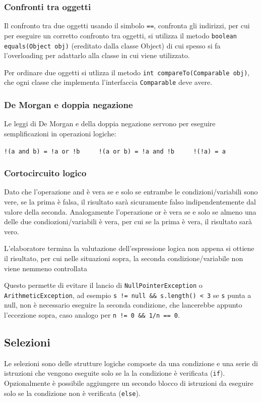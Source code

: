 \documentclass{article}
\begin{document}
\subsubsection*{Confronti tra oggetti}
Il confronto tra due oggetti usando il simbolo \verb|==|, confronta gli indirizzi, per cui per eseguire un corretto confronto tra
oggetti, si utilizza il metodo \verb|boolean equals(Object obj)| (ereditato dalla classe Object) di cui spesso si fa l'overloading
per adattarlo alla classe in cui viene utilizzato.

Per ordinare due oggetti si utlizza il metodo \verb|int compareTo(Comparable obj)|, che ogni classe che implementa l'interfaccia
\verb|Comparable| deve avere.

\subsubsection*{De Morgan e doppia negazione}
Le leggi di De Morgan e della doppia negazione servono per eseguire semplificazioni in operazioni logiche:
\begin{center}
	\verb|!(a and b) = !a or !b| \(\qquad\) \verb|!(a or b) = !a and !b| \(\qquad\) \verb|!(!a) = a|
\end{center}

\subsubsection*{Cortocircuito logico}
Dato che l'operazione and è vera se e solo se entrambe le condizioni/variabili sono vere, se la prima è falsa, il risultato sarà
sicuramente falso indipendentemente dal valore della seconda. Analogamente l'operazione or è vera se e solo se almeno una delle
due condiozioni/variabili è vera, per cui se la prima è vera, il risultato sarà vero.

L'elaboratore termina la valutazione dell'espressione logica non appena si ottiene il risultato, per cui nelle situazioni sopra,
la seconda condizione/variabile non viene nemmeno controllata

Questo permette di evitare il lancio di \verb|NullPointerException| o \verb|ArithmeticException|, ad esempio \verb|s != null && s.length() < 3|
se \verb|s| punta a null, non è necessario eseguire la seconda condizione, che lancerebbe appunto l'eccezione sopra, caso analogo per \verb|n != 0 && 1/n == 0|.

\newpage


\subsection{Selezioni}
Le selezioni sono delle strutture logiche composte da una condizione e una serie di istruzioni che vengono eseguite solo se la
la condizione è verificata (\verb|if|). Opzionalmente è possibile aggiungere un secondo blocco di istruzioni da eseguire solo
se la condizione non è verificata (\verb|else|).
\end{document}
